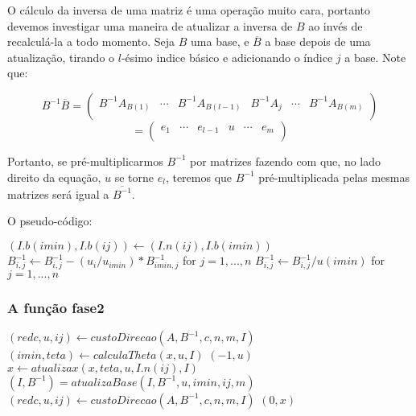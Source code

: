 \documentclass[12pt]{article}
\begin{document}
O cálculo da inversa de uma matriz é uma operação muito cara, portanto devemos investigar uma maneira de atualizar a inversa de $B$ ao invés de recalculá-la a todo momento. Seja $B$ uma base, e $\overline{B}$ a base depois de uma atualização, tirando o $l$-ésimo indice básico e adicionando o índice $j$ a base. Note que:
\begin{center}
$$
B^{-1}\overline{B} =
\begin{pmatrix}
B^{-1}A_{B(1)}  & \cdots & B^{-1}A_{B(l - 1)} & B^{-1}A_j & \cdots & B^{-1}A_{B(m)} \\    
\end{pmatrix}
$$
$$
=\begin{pmatrix}
e_1  & \cdots & e_{l-1} & u & \cdots & e_m \\    
\end{pmatrix}
$$
\end{center}
Portanto, se pré-multiplicarmos $B^{-1}$ por matrizes fazendo com que, no lado direito da equação, $u$ se torne $e_l$, teremos que $B^{-1}$ pré-multiplicada pelas mesmas matrizes será igual a $\overline{B^{-1}}$.

O pseudo-código:
\begin{algorithmic}
\State $(I.b(imin), I.b(ij)) \gets (I.n(ij), I.b(imin))$
		\State $B^{-1}_{i, j} \gets B^{-1}_{i, j} - (u_i / u_{imin}) * B^{-1}_{imin, j}$ for $j = 1, ..., n$
	\EndIf
\EndFor
\State $B^{-1}_{i, j} \gets B^{-1}_{i, j} / u(imin)$ for $j = 1, ..., n$
\EndFunction
\end{algorithmic}


\subsubsection{A função fase2}
\begin{algorithmic}
	\State $(redc, u, ij) \gets custoDirecao (A, B^{-1}, c, n, m, I)$
    		\State $(imin, teta) \gets calculaTheta(x, u, I)$
    		    			\Return $(-1, u)$
    		\EndIf
    		\State $x \gets atualizax(x, teta, u, I.n(ij), I)$
    		\State $(I, B^{-1}) = atualizaBase(I, B^{-1}, u, imin, ij, m)$
    		\State $(redc, u, ij) \gets custoDirecao (A, B^{-1}, c, n, m, I)$
    \EndWhile
    \Return $(0, x)$
\EndFunction
\end{algorithmic}
\end{document}
